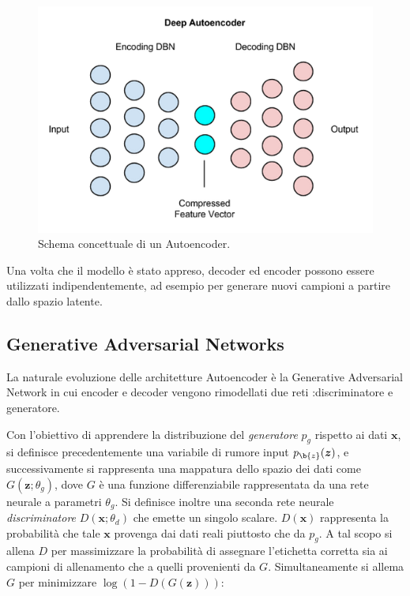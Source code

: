 \begin{figure}[!htbp]
	\centering
	\includegraphics[width=\columnwidth]{figures/deep_autoencoder.png}
	\caption{Schema concettuale di un Autoencoder.  \label{fig:aut} }
\end{figure}

Una volta che il modello è stato appreso, decoder ed encoder possono essere utilizzati indipendentemente, ad esempio per generare nuovi campioni a partire dallo spazio latente.

\subsection{Generative Adversarial Networks}
La naturale evoluzione delle architetture Autoencoder è la Generative Adversarial Network in cui encoder e decoder vengono rimodellati due reti :discriminatore e generatore. 

Con l'obiettivo di apprendere la distribuzione del \textit{generatore} $p_g$ rispetto ai dati $\bm{x}$, si definisce precedentemente una variabile di rumore input  $p_{\b{z}}(\bm{z})$, e successivamente si rappresenta una mappatura dello spazio dei dati come $G(\bm{z}; \theta_g)$, dove $G$ è una funzione differenziabile rappresentata da una rete neurale a parametri $\theta_g$. Si definisce inoltre una seconda rete neurale \textit{discriminatore}
 $D(\bm{x}; \theta_d)$ che emette un singolo scalare. $D(\bm{x})$ rappresenta la probabilità che tale $\bm{x}$ provenga dai dati reali piuttosto che da $p_g$. 
A tal scopo si allena $D$ per massimizzare la probabilità di assegnare l'etichetta corretta sia ai campioni di allenamento che a quelli provenienti da $G$.
Simultaneamente si allema $G$ per minimizzare $\log(1-D(G(\bm{z})))$:

